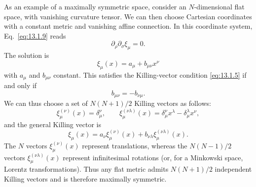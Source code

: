 As an example of a maximally symmetric space, consider an \(N\)-dimensional
flat space, with vanishing curvature tensor. We can then choose Cartesian
coordinates with a constant metric and vanishing affine connection. In this
coordinate system, Eq.~\eqref{eq:13.1.9} reads
\[
  \partial_\rho\partial_\sigma\xi_\mu=0.
\]
The solution is
\[
  \xi_\mu(x)=a_\mu+b_{\mu\nu}x^\nu
\]
with \(a_\mu\) and \(b_{\mu\nu}\) constant. This satisfies the Killing-vector
condition \eqref{eq:13.1.5} if and only if
\[
  b_{\mu\nu}=-b_{\nu\mu}.
\]
We can thus choose a set of \(N(N+1)/2\) Killing vectors as follows:
\[
  \xi_\mu^{(\nu)}(x)=\delta_\mu^\nu,
  \qquad
  \xi_\mu^{(\nu\lambda)}(x)
  =
  \delta_\mu^\nu x^\lambda-\delta_\mu^\lambda x^\nu,
\]
and the general Killing vector is
\[
  \xi_\mu(x)
  =
  a_\nu\xi_\mu^{(\nu)}(x)
  +b_{\nu\lambda}\xi_\mu^{(\nu\lambda)}(x).
\]
The \(N\) vectors \(\xi_\mu^{(\nu)}(x)\) represent translations, whereas
the \(N(N-1)/2\) vectors \(\xi_\mu^{(\nu\lambda)}(x)\) represent
infinitesimal rotations (or, for a Minkowski space, Lorentz transformations).
Thus any flat metric admits \(N(N+1)/2\) independent Killing vectors and is
therefore maximally symmetric.

